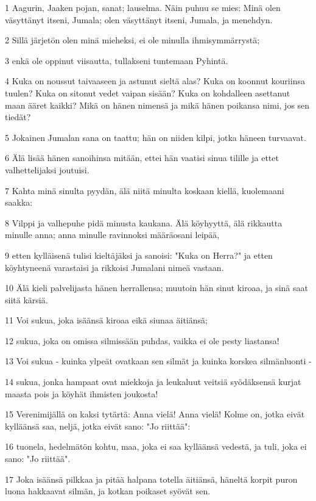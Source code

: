 \par 1 Aagurin, Jaaken pojan, sanat; lauselma. Näin puhuu se mies: Minä olen väsyttänyt itseni, Jumala; olen väsyttänyt itseni, Jumala, ja menehdyn.
\par 2 Sillä järjetön olen minä mieheksi, ei ole minulla ihmisymmärrystä;
\par 3 enkä ole oppinut viisautta, tullakseni tuntemaan Pyhintä.
\par 4 Kuka on noussut taivaaseen ja astunut sieltä alas? Kuka on koonnut kouriinsa tuulen? Kuka on sitonut vedet vaipan sisään? Kuka on kohdalleen asettanut maan ääret kaikki? Mikä on hänen nimensä ja mikä hänen poikansa nimi, jos sen tiedät?
\par 5 Jokainen Jumalan sana on taattu; hän on niiden kilpi, jotka häneen turvaavat.
\par 6 Älä lisää hänen sanoihinsa mitään, ettei hän vaatisi sinua tilille ja ettet valhettelijaksi joutuisi.
\par 7 Kahta minä sinulta pyydän, älä niitä minulta koskaan kiellä, kuolemaani saakka:
\par 8 Vilppi ja valhepuhe pidä minusta kaukana. Älä köyhyyttä, älä rikkautta minulle anna; anna minulle ravinnoksi määräosani leipää,
\par 9 etten kylläisenä tulisi kieltäjäksi ja sanoisi: "Kuka on Herra?" ja etten köyhtyneenä varastaisi ja rikkoisi Jumalani nimeä vastaan.
\par 10 Älä kieli palvelijasta hänen herrallensa; muutoin hän sinut kiroaa, ja sinä saat siitä kärsiä.
\par 11 Voi sukua, joka isäänsä kiroaa eikä siunaa äitiänsä;
\par 12 sukua, joka on omissa silmissään puhdas, vaikka ei ole pesty liastansa!
\par 13 Voi sukua - kuinka ylpeät ovatkaan sen silmät ja kuinka korskea silmänluonti -
\par 14 sukua, jonka hampaat ovat miekkoja ja leukaluut veitsiä syödäksensä kurjat maasta pois ja köyhät ihmisten joukosta!
\par 15 Verenimijällä on kaksi tytärtä: Anna vielä! Anna vielä! Kolme on, jotka eivät kylläänsä saa, neljä, jotka eivät sano: "Jo riittää":
\par 16 tuonela, hedelmätön kohtu, maa, joka ei saa kylläänsä vedestä, ja tuli, joka ei sano: "Jo riittää".
\par 17 Joka isäänsä pilkkaa ja pitää halpana totella äitiänsä, häneltä korpit puron luona hakkaavat silmän, ja kotkan poikaset syövät sen.

